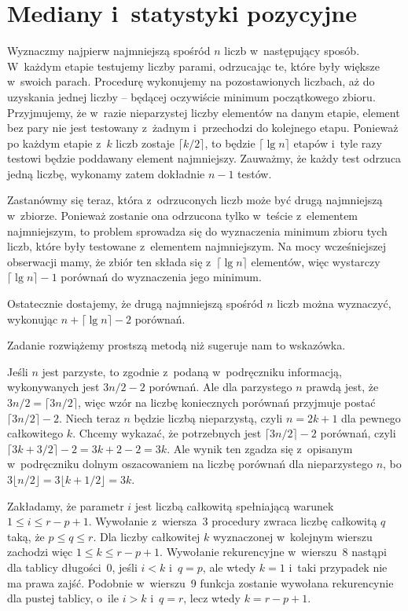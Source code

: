 \chapter{Mediany i~statystyki pozycyjne}


\exercise %
Wyznaczmy najpierw najmniejszą spośród $n$ liczb w~następujący sposób. W~każdym etapie testujemy liczby parami, odrzucając te, które były większe w~swoich parach. Procedurę wykonujemy na pozostawionych liczbach, aż do uzyskania jednej liczby -- będącej oczywiście minimum początkowego zbioru. Przyjmujemy, że w~razie nieparzystej liczby elementów na danym etapie, element bez pary nie jest testowany z~żadnym i~przechodzi do kolejnego etapu. Ponieważ po każdym etapie z~$k$ liczb zostaje $\lceil k/2\rceil$, to będzie $\lceil\lg n\rceil$ etapów i~tyle razy testowi będzie poddawany element najmniejszy. Zauważmy, że każdy test odrzuca jedną liczbę, wykonamy zatem dokładnie $n-1$ testów.

Zastanówmy się teraz, która z~odrzuconych liczb może być drugą najmniejszą w~zbiorze. Ponieważ zostanie ona odrzucona tylko w~teście z~elementem najmniejszym, to problem sprowadza się do wyznaczenia minimum zbioru tych liczb, które były testowane z~elementem najmniejszym. Na mocy wcześniejszej obserwacji mamy, że zbiór ten składa się z~$\lceil\lg n\rceil$ elementów, więc wystarczy $\lceil\lg n\rceil-1$ porównań do wyznaczenia jego minimum.

Ostatecznie dostajemy, że drugą najmniejszą spośród $n$ liczb można wyznaczyć, wykonując $n+\lceil\lg n\rceil-2$ porównań.

\exercise %
Zadanie rozwiążemy prostszą metodą niż sugeruje nam to wskazówka.

Jeśli $n$ jest parzyste, to zgodnie z~podaną w~podręczniku informacją, wykonywanych jest $3n/2-2$ porównań. Ale dla parzystego $n$ prawdą jest, że $3n/2=\lceil3n/2\rceil$, więc wzór na liczbę koniecznych porównań przyjmuje postać $\lceil3n/2\rceil-2$. Niech teraz $n$ będzie liczbą nieparzystą, czyli $n=2k+1$ dla pewnego całkowitego $k$. Chcemy wykazać, że potrzebnych jest $\lceil3n/2\rceil-2$ porównań, czyli $\lceil3k+3/2\rceil-2=3k+2-2=3k$. Ale wynik ten zgadza się z~opisanym w~podręczniku dolnym oszacowaniem na liczbę porównań dla nieparzystego $n$, bo $3\lfloor n/2\rfloor=3\lfloor k+1/2\rfloor=3k$.


\exercise %
Zakładamy, że parametr $i$ jest liczbą całkowitą spełniającą warunek $1\le i\le r-p+1$. Wywołanie z~wiersza~3 procedury  zwraca liczbę całkowitą $q$ taką, że $p\le q\le r$. Dla liczby całkowitej $k$ wyznaczonej w~kolejnym wierszu zachodzi więc $1\le k\le r-p+1$. Wywołanie rekurencyjne w~wierszu~8 nastąpi dla tablicy długości~0, jeśli $i<k$ i~$q=p$, ale wtedy $k=1$ i~taki przypadek nie ma prawa zajść. Podobnie w~wierszu~9 funkcja zostanie wywołana rekurencynie dla pustej tablicy, o~ile $i>k$ i~$q=r$, lecz wtedy $k=r-p+1$.

